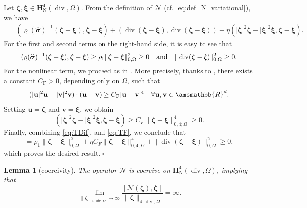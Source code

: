 \documentclass[fleqn,a4paper]{cas-sc}
\newcommand\qan{\quad\hbox{and}\quad}
\newcommand\vdiv{\mathop{\mathrm{div}}\nolimits}
\newcommand{\bbR}{\amsmathbb{R}}
\newcommand{\bxi}{\boldsymbol{\xi}}
\newcommand{\bzeta}{\boldsymbol{\zeta}}
\newcommand{\0}{\boldsymbol{0}}
\newcommand\cN{\mathcal{N}}
\newcommand\bH{\mathbf{H}}
\newcommand\bsigma{\boldsymbol{\sigma}}
\numberwithin{equation}{section}
\numberwithin{figure}{section}
\newtheorem{lemma}[theorem]{Lemma}
\newenvironment{proof}{\noindent{\it Proof.}}{\hfill$\square$}
\begin{document}
\begin{proof}
    Let $\bzeta, \bxi \in \bH^4_{\mathrm{N}}(\vdiv,\Omega)$. From the definition of $\mathcal{N}$ (cf. \eqref{eq:def_N_variational}), we have
    \begin{align*}
        [\cN(\bzeta) - \cN(\bxi), \bzeta - \bxi] = (\varrho(\widehat{\bsigma})^{-1}(\bzeta - \bxi), \bzeta - \bxi) + (\vdiv(\bzeta - \bxi), \vdiv(\bzeta - \bxi)) + \eta (|\bzeta|^2\bzeta - |\bxi|^2\bxi, \bzeta - \bxi).
    \end{align*}
    For the first and second terms on the right-hand side, it is easy to see that
    \begin{equation}\label{eq:TDif}
        (\varrho(\widehat{\bsigma})^{-1}(\bzeta - \bxi), \bzeta - \bxi) \geq \rho_1 \|\bzeta - \bxi\|_{0,\Omega}^2 \ge 0 \qan   \|\vdiv(\bzeta - \bxi)\|_{0,\Omega}^2 \ge 0.
    \end{equation} 
    For the nonlinear term, we proceed as in \cite[Section 2.3]{Caucao2020}. More precisely, thanks to \cite[Lemma 5.1]{Glowinski1975}, there exists a constant $C_{\text{F}} > 0$, depending only on $\Omega$, such that
    \begin{equation*}
        (|\mathbf{u}|^2\mathbf{u} - |\mathbf{v}|^2\mathbf{v}) \cdot (\mathbf{u} - \mathbf{v}) \ge C_{\text{F}} |\mathbf{u} - \mathbf{v}|^4 \quad \forall \mathbf{u}, \mathbf{v} \in \bbR^d.
    \end{equation*}
    Setting $\mathbf{u} = \bzeta$ and $\mathbf{v} = \bxi$, we obtain
    \begin{equation}\label{eq:TF}
        (|\bzeta|^2\bzeta - |\bxi|^2\bxi, \bzeta - \bxi) \ge C_{F} \|\bzeta - \bxi\|_{0,4;\Omega}^4 \ge 0.
    \end{equation}
    Finally, combining \eqref{eq:TDif}, and \eqref{eq:TF}, we conclude that
    \begin{equation*}%
        [\cN(\bzeta) - \cN(\bxi), \bzeta - \bxi] = \rho_1 \|\bzeta - \bxi\|_{0,\Omega}^2+\eta C_F \|\bzeta - \bxi\|_{0,4;\Omega}^4 + \|\vdiv(\bzeta - \bxi)\|_{0,\Omega}^2 \ge 0,
    \end{equation*}
    which proves the desired result.
\end{proof}
\begin{lemma}[coercivity]\label{lem:coercivity}
    The operator $\cN$ is coercive on $\bH^4_{\mathrm{N}}(\vdiv,\Omega)$, implying that
\[\lim_{\|\bzeta\|_{{4,\vdiv;\Omega}} \to \infty} \frac{[\cN(\bzeta), \bzeta]}{\|\bzeta\|_{{4,\vdiv;\Omega}}} = \infty.\]
\end{lemma}
\end{document}
